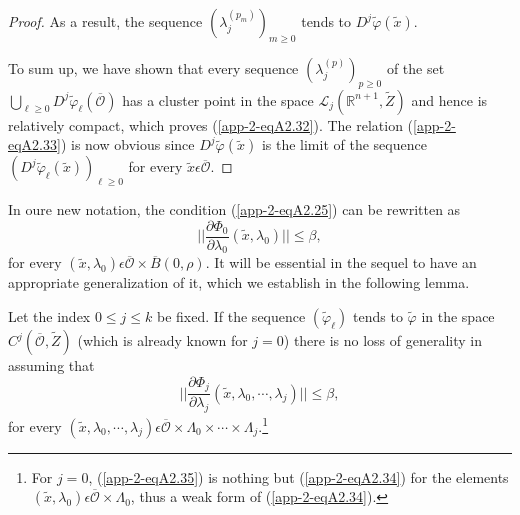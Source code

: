 \begin{proof}
As a result, the sequence $(\lambda_{j}^{(p_{m})})_{m \geq 0}$ tends
to $D^{j}\widetilde{\varphi}(\widetilde{x})$.

To sum up, we have shown that every sequence $(\lambda_{j}^{(p)})_{p
  \geq 0}$ of the set $\bigcup\limits_{\ell \geq 0}
D^{j}\widetilde{\varphi}_{\ell} (\overline{\mathscr{O}})$ has a
cluster point in the space $\mathscr{L}_{j}(\mathbb{R}^{n+1},
\widetilde{Z})$ and hence is relatively compact, which proves
(\ref{app-2-eqA2.32}). The relation (\ref{app-2-eqA2.33}) is now obvious since
$D^{j}\widetilde{\varphi}(\widetilde{x})$ is the limit of the sequence
$(D^{j}\widetilde{\varphi}_{\ell} (\widetilde{x}))_{\ell \geq 0}$ for
every $\widetilde{x} \epsilon \overline{\mathscr{O}}$.
\end{proof}

In oure new notation, the condition (\ref{app-2-eqA2.25}) can be rewritten as
\begin{equation*}
||\frac{\partial \Phi_{0}}{\partial \lambda_{0}} (\widetilde{x},
\lambda_{0})|| \leq \beta,\tag{A2.34}\label{app-2-eqA2.34}
\end{equation*}
for every $(\widetilde{x}, \lambda_{0}) \epsilon
\overline{\mathscr{O}} \times \overline{B} (0, \rho)$. It will be
essential in the sequel to have an appropriate generalization of it,
which we establish in the following lemma.

\begin{alphlemma}\label{app-2-lemA2.5}%
Let the index $0 \leq j \leq k$ be fixed. If the sequence
$(\widetilde{\varphi}_{\ell})$ tends to $\widetilde{\varphi}$ in the
space $C^{j}(\overline{\mathscr{O}}, \widetilde{Z})$ (which is
  already known for $j = 0$) there is no loss of generality in
  assuming that
\begin{equation*}
||\frac{\partial \Phi_{j}}{\partial \lambda_{j}} (\widetilde{x},
\lambda_{0}, \cdots, \lambda_{j})|| \leq \beta,\tag{A2.35}\label{app-2-eqA2.35}
\end{equation*}
for every $(\widetilde{x}, \lambda_{0}, \cdots, \lambda_{j}) \epsilon
\overline{\mathscr{O}} \times \Lambda_{0} \times \cdots \times
\Lambda_{j}$.\footnote{For $j = 0$, (\ref{app-2-eqA2.35}) is nothing but (\ref{app-2-eqA2.34}) for the elements $(\widetilde{x}, \lambda_{0}) \epsilon
\overline{\mathscr{O}} \times \Lambda_{0}$, thus a weak form of (\ref{app-2-eqA2.34}).}
\end{alphlemma}

